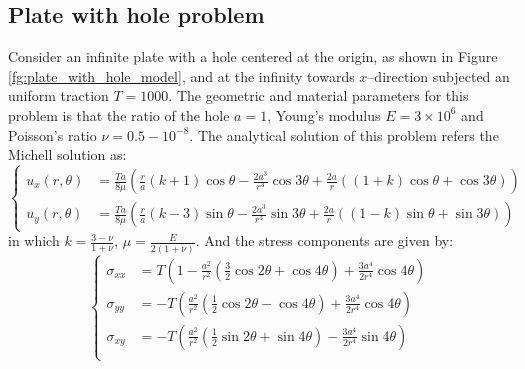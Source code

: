\subsection{Plate with hole problem}
Consider an infinite plate with a hole centered at the origin, as shown in Figure \ref{fg:plate_with_hole_model},
and at the infinity towards $x$--direction subjected an uniform traction $T=1000$.
The geometric and material parameters for this problem is that the ratio of the hole $a=1$, Young's modulus $E=3\times 10^6$ and Poisson's ratio $\nu = 0.5-10^{-8}$.
The analytical solution of this problem refers the Michell solution \cite{timoshenko1969theory} as:
\begin{equation}\label{plate_with_hole_exact}
    \left \{
    \begin{aligned}
        u_x(r,\theta)&=\frac{Ta}{8\mu}\left (\frac{r}{a}(k+1)\cos\theta-\frac{2a^3}{r^3}\cos3\theta    +\frac{2a}{r}((1+k)\cos\theta+\cos3\theta) \right )\\
        u_y(r,\theta)&=\frac{Ta}{8\mu}\left (\frac{r}{a}(k-3)\sin\theta-\frac{2a^3}{r^3}\sin3\theta    +\frac{2a}{r}((1-k)\sin\theta+\sin3\theta) \right )  
    \end{aligned}
    \right .
\end{equation}
in which $k = \frac{3-\nu}{1+\nu}$, $\mu = \frac{E}{2(1+\nu)}$.
And the stress components are given by:
\begin{equation}
    \left \{
    \begin{aligned}
        \sigma_{xx}&=T\left (1-\frac{a^2}{r^2}(\frac{3}{2}\cos2\theta+\cos4\theta)+\frac{3a^4}{2r^4}\cos4\theta\right )\\
        \sigma_{yy}&=-T\left (\frac{a^2}{r^2}(\frac{1}{2}\cos2\theta-\cos4\theta)+\frac{3a^4}{2r^4}\cos4\theta\right )\\
        \sigma_{xy}&=-T\left (\frac{a^2}{r^2}(\frac{1}{2}\sin2\theta+\sin4\theta)-\frac{3a^4}{2r^4}\sin4\theta\right )\\
    \end{aligned}
    \right .
\end{equation}

